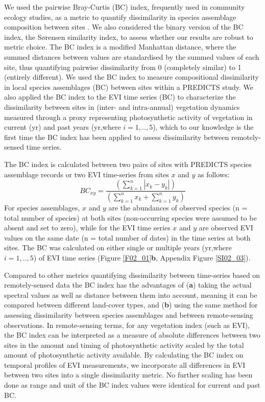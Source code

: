 We used the pairwise Bray-Curtis (BC) index, frequently used in community ecology studies, as a metric to quantify dissimilarity in species assemblage composition between sites \citep{Bray1957,Faith1987,Su2004}. We also considered the binary version of the BC index, the S\o rensen similarity index, to assess whether our results are robust to metric choice. The BC index is a modified Manhattan distance, where the summed distances between values are standardised by the summed values of each site, thus quantifying pairwise dissimilarity from 0 (completely similar) to 1 (entirely different). We used the BC index to measure compositional dissimilarity in local species assemblages (BC) between sites within a PREDICTS study. We also applied the BC index to the EVI time series (BC) to characterize the dissimilarity between sites in (inter- and intra-annual) vegetation dynamics measured through a proxy representing photosynthetic activity of vegetation in current (yr) and past years (yr,where $i = 1,..,5$), which to our knowledge is the first time the BC index has been applied to assess dissimilarity between remotely-sensed time series.

The BC index is calculated between two pairs of sites with PREDICTS species assemblage records or two EVI time-series from sites $x$ and $y$ as follows: 
\begin{equation*}
    BC_{xy} = \frac{( \sum_{k=1}^{n} |x_k - y_k  | )}{ (\sum_{k=1}^{n} x_k + \sum_{k=1}^{n} y_k )}
\end{equation*}
For species assemblages, $x$ and $y$ are the abundances of observed species (n = total number of species) at both sites (non-occurring species were assumed to be absent and set to zero), while for the EVI time series $x$ and $y$ are observed EVI values on the same date (n = total number of dates) in the time series at both sites. The BC was calculated on either single or multiple years (yr,where $i = 1,..,5$) of EVI time series (Figure \ref{F02_01}\textbf{b}, Appendix Figure \ref{SI02_03}).

Compared to other metrics quantifying dissimilarity between time-series based on remotely-sensed data \citep{Lhermitte2011} the BC index has the advantages of (\textbf{a}) taking the actual spectral values as well as distance between them into account, meaning it can be compared between different land-cover types, and (\textbf{b}) using the same method for assessing dissimilarity between species assemblages and between remote-sensing observations. In remote-sensing terms, for any vegetation index (such as EVI), the BC index can be interpreted as a measure of absolute differences between two sites in the amount and timing of photosynthetic activity scaled by the total amount of photosynthetic activity available. By calculating the BC index on temporal profiles of EVI measurements, we incorporate all differences in EVI between two sites into a single dissimilarity metric. No further scaling has been done as range and unit of the BC index values were identical for current and past BC.


